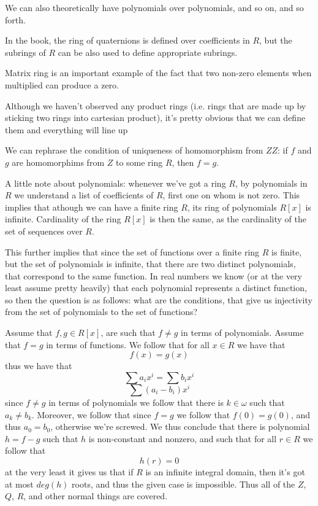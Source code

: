 \documentclass[11pt,oneside,titlepage]{book}
\begin{document}
We can also theoretically have polynomials over polynomials, and so
on, and so forth.

In the book, the ring of quaternions is defined over coefficients in
$R$, but the subrings of $R$ can be also used to define appropriate
subrings.

Matrix ring is an important example of the fact that two non-zero
elements when multiplied can produce a zero.

Although we haven't observed any product rings (i.e. rings that are
made up by sticking two rings into cartesian product), it's pretty
obvious that we can define them and everything will line up

We can rephrase the condition of uniqueness of homomorphism from $ZZ$:
if $f$ and $g$ are homomorphims from $Z$ to some ring $R$, then $f =
g$.

A little note about polynomials: whenever we've got a ring $R$, by
polynomials in $R$ we understand a list of coefficients of $R$, first
one on whom is not zero. This implies that athough we can have a
finite ring $R$, its ring of polynomials $R[x]$ is
infinite. Cardinality of the ring $R[x]$ is then the same, as the
cardinality of the set of sequences over $R$.

This further implies that since the set of functions over a finite
ring $R$ is finite, but the set of polynomials is infinite, that there
are two distinct polynomials, that correspond to the same function. In
real numbers we know (or at the very least assume pretty heavily) that
each polynomial represents a distinct function, so then the question
is as follows: what are the conditions, that give us injectivity from
the set of polynomials to the set of functions?

Assume that $f, g \in R[x]$, are such that $f \neq g$ in terms of
polynomials. Assume that $f = g$ in terms of functions.  We follow
that for all $x \in R$ we have that
$$f(x) = g(x)$$
thus we have that
$$\sum{a_i x^i} = \sum{b_i x^i} $$
$$\sum{(a_i - b_i)x^i}$$
since $f \neq g$ in terms of polynomials we follow that there is $k
\in \omega$ such that $a_k \neq b_k$. Moreover, we follow that since
$f = g$ we follow that $f(0) = g(0)$, and thus $a_0 = b_0$, otherwise
we're screwed. We thus conclude that there is polynomial $h = f - g$
such that $h$ is non-constant and nonzero, and such that for all $r
\in R$ we follow that
$$h(r) = 0$$
at the very least it gives us that if $R$ is an infinite integral
domain, then it's got at most $deg(h)$ roots, and thus the given case
is impossible. Thus all of the $Z$, $Q$, $R$, and other normal things
are covered.
\end{document}
